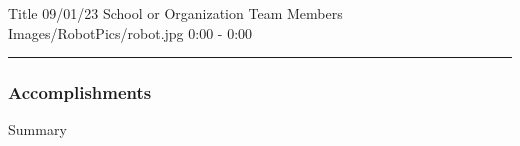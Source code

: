 \insertmeeting
	{Title} 
	{09/01/23} 
	{School or Organization}
	{Team Members}
	{Images/RobotPics/robot.jpg}
	{0:00 - 0:00}

 


\noindent\hfil\rule{\textwidth}{.4pt}\hfil

\subsubsection*{Accomplishments}
Summary


    
